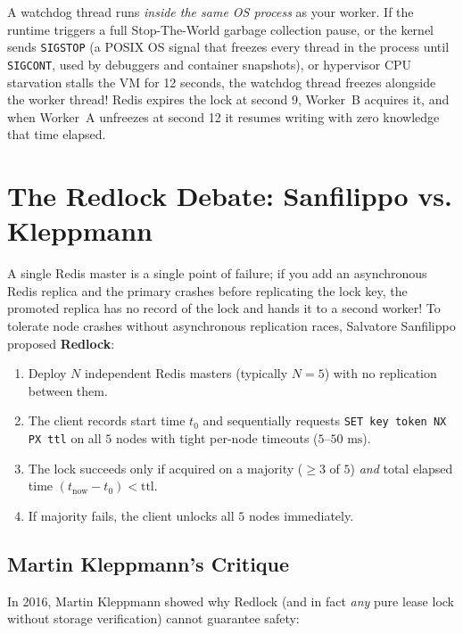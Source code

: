 \begin{commonmistakebox}
A watchdog thread runs \emph{inside the same OS process} as your worker. If the runtime triggers a full Stop-The-World garbage collection pause, or the kernel sends \texttt{SIGSTOP} (a POSIX OS signal that freezes every thread in the process until \texttt{SIGCONT}, used by debuggers and container snapshots), or hypervisor CPU starvation stalls the VM for 12 seconds, the watchdog thread freezes alongside the worker thread! Redis expires the lock at second 9, Worker~B acquires it, and when Worker~A unfreezes at second 12 it resumes writing with zero knowledge that time elapsed.
\end{commonmistakebox}

\section{The Redlock Debate: Sanfilippo vs. Kleppmann}

A single Redis master is a single point of failure; if you add an asynchronous Redis replica and the primary crashes before replicating the lock key, the promoted replica has no record of the lock and hands it to a second worker! To tolerate node crashes without asynchronous replication races, Salvatore Sanfilippo proposed \textbf{Redlock}:
\begin{enumerate}[leftmargin=18pt]
  \item Deploy $N$ independent Redis masters (typically $N=5$) with no replication between them.
  \item The client records start time $t_0$ and sequentially requests \texttt{SET key token NX PX ttl} on all $5$ nodes with tight per-node timeouts ($5\text{--}50\text{ ms}$).
  \item The lock succeeds only if acquired on a majority ($\ge 3$ of $5$) \emph{and} total elapsed time $(t_{\text{now}} - t_0) < \text{ttl}$.
  \item If majority fails, the client unlocks all $5$ nodes immediately.
\end{enumerate}

\subsection{Martin Kleppmann's Critique}

In 2016, Martin Kleppmann showed why Redlock (and in fact \emph{any} pure lease lock without storage verification) cannot guarantee safety:

